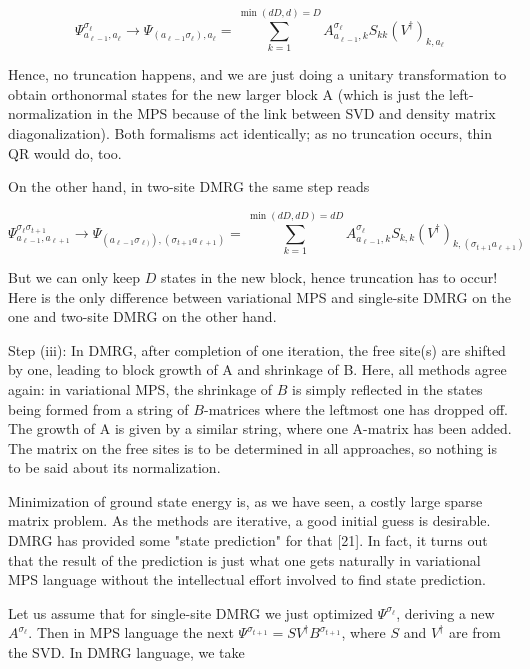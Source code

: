 \documentclass[12pt]{article}
\begin{document}
\begin{equation*}
\Psi_{a_{\ell-1}, a_{\ell}}^{\sigma_{\ell}} \rightarrow \Psi_{\left(a_{\ell-1} \sigma_{\ell}\right), a_{\ell}}=\sum_{k=1}^{\min (d D, d)=D} A_{a_{\ell-1}, k}^{\sigma_{\ell}} S_{k k}\left(V^{\dagger}\right)_{k, a_{\ell}} \tag{220}
\end{equation*}


Hence, no truncation happens, and we are just doing a unitary transformation to obtain orthonormal states for the new larger block A (which is just the left-normalization in the MPS because of the link between SVD and density matrix diagonalization). Both formalisms act identically; as no truncation occurs, thin QR would do, too.

On the other hand, in two-site DMRG the same step reads


\begin{equation*}
\Psi_{a_{\ell-1}, a_{\ell+1}}^{\sigma_{\ell} \sigma_{t+1}} \rightarrow \Psi_{\left(a_{\ell-1} \sigma_{\ell)}\right),\left(\sigma_{t+1} a_{\ell+1}\right)}=\sum_{k=1}^{\min (d D, d D)=d D} A_{a_{\ell-1}, k}^{\sigma_{\ell}} S_{k, k}\left(V^{\dagger}\right)_{k,\left(\sigma_{t+1} a_{\ell+1}\right)} \tag{221}
\end{equation*}


But we can only keep $D$ states in the new block, hence truncation has to occur! Here is the only difference between variational MPS and single-site DMRG on the one and two-site DMRG on the other hand.

Step (iii): In DMRG, after completion of one iteration, the free site(s) are shifted by one, leading to block growth of A and shrinkage of B. Here, all methods agree again: in variational MPS, the shrinkage of $B$ is simply reflected in the states being formed from a string of $B$-matrices where the leftmost one has dropped off. The growth of A is given by a similar string, where one A-matrix has been added. The matrix on the free sites is to be determined in all approaches, so nothing is to be said about its normalization.

Minimization of ground state energy is, as we have seen, a costly large sparse matrix problem. As the methods are iterative, a good initial guess is desirable. DMRG has provided some "state prediction" for that [21]. In fact, it turns out that the result of the prediction is just what one gets naturally in variational MPS language without the intellectual effort involved to find state prediction.

Let us assume that for single-site DMRG we just optimized $\Psi^{\sigma_{\ell}}$, deriving a new $A^{\sigma_{\ell}}$. Then in MPS language the next $\Psi^{\sigma_{t+1}}=S V^{\dagger} B^{\sigma_{t+1}}$, where $S$ and $V^{\dagger}$ are from the SVD. In DMRG language, we take
\end{document}
